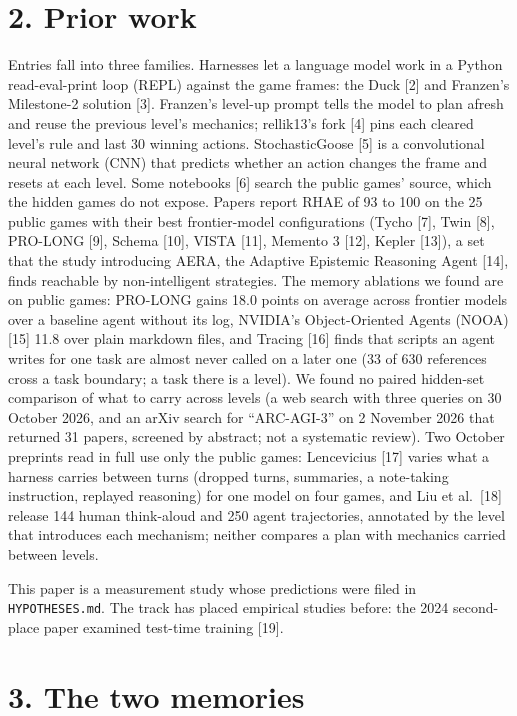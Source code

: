 \documentclass[
  11pt,
]{article}
\begin{document}
\section{2. Prior work}\label{prior-work}

Entries fall into three families. Harnesses let a language model work in
a Python read-eval-print loop (REPL) against the game frames: the Duck
{[}2{]} and Franzen's Milestone-2 solution {[}3{]}. Franzen's level-up
prompt tells the model to plan afresh and reuse the previous level's
mechanics; rellik13's fork {[}4{]} pins each cleared level's rule and
last 30 winning actions. StochasticGoose {[}5{]} is a convolutional
neural network (CNN) that predicts whether an action changes the frame
and resets at each level. Some notebooks {[}6{]} search the public
games' source, which the hidden games do not expose. Papers report RHAE
of 93 to 100 on the 25 public games with their best frontier-model
configurations (Tycho {[}7{]}, Twin {[}8{]}, PRO-LONG {[}9{]}, Schema
{[}10{]}, VISTA {[}11{]}, Memento 3 {[}12{]}, Kepler {[}13{]}), a set
that the study introducing AERA, the Adaptive Epistemic Reasoning Agent
{[}14{]}, finds reachable by non-intelligent strategies. The memory
ablations we found are on public games: PRO-LONG gains 18.0 points on
average across frontier models over a baseline agent without its log,
NVIDIA's Object-Oriented Agents (NOOA) {[}15{]} 11.8 over plain markdown
files, and Tracing {[}16{]} finds that scripts an agent writes for one
task are almost never called on a later one (33 of 630 references cross
a task boundary; a task there is a level). We found no paired hidden-set
comparison of what to carry across levels (a web search with three
queries on 30 October 2026, and an arXiv search for ``ARC-AGI-3'' on 2
November 2026 that returned 31 papers, screened by abstract; not a
systematic review). Two October preprints read in full use only the
public games: Lencevicius {[}17{]} varies what a harness carries between
turns (dropped turns, summaries, a note-taking instruction, replayed
reasoning) for one model on four games, and Liu et al.~{[}18{]} release
144 human think-aloud and 250 agent trajectories, annotated by the level
that introduces each mechanism; neither compares a plan with mechanics
carried between levels.

This paper is a measurement study whose predictions were filed in
\texttt{HYPOTHESES.md}. The track has placed empirical studies before:
the 2024 second-place paper examined test-time training {[}19{]}.

\section{3. The two memories}\label{the-two-memories}
\end{document}
